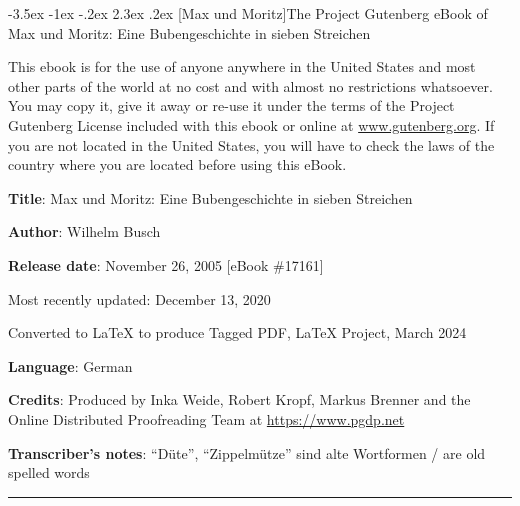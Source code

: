 \documentclass[a4paper,12pt]{article}
\makeatletter
\renewcommand\section{\@startsection {section}{1}{\z@}%
                                   {-3.5ex \@plus -1ex \@minus -.2ex}%
                                   {2.3ex \@plus.2ex}%
                                   {\centering\normalfont\LARGE\bfseries}}
\makeatother
\begin{document}
  
  
\begin{otherlanguage}{english}

  \section[Max und Moritz]{The Project Gutenberg eBook of {Max und
      Moritz: Eine Bubengeschichte in sieben
      Streichen}\label{pg-header-heading}}

    


This ebook is for the use of anyone anywhere in the United States and
most other parts of the world at no cost and with almost no restrictions
whatsoever. You may copy it, give it away or re-use it under the terms
of the Project Gutenberg License included with this ebook or online
at \href{https://www.gutenberg.org}{www.gutenberg.org}. If you are not located in the United States,
you will have to check the laws of the country where you are located
before using this eBook.

    
\end{otherlanguage}


\bigskip

\textbf{Title}: Max und Moritz: Eine Bubengeschichte in sieben Streichen

\textbf{Author}: Wilhelm Busch


\smallskip

\begin{otherlanguage}{english}
\textbf{Release date}: November 26, 2005 [eBook \#17161]

                Most recently updated: December 13, 2020

        Converted to \textsf{\LaTeX} to produce Tagged PDF, \textsf{\LaTeX} Project, March 2024

\smallskip
                
\textbf{Language}: German

\smallskip
                
\textbf{Credits}: Produced by Inka Weide, Robert Kropf, Markus Brenner and
        the Online Distributed Proofreading Team at
        \url{https://www.pgdp.net}


\smallskip

\textbf{Transcriber's notes}: 
``Düte'', ``Zippelmütze'' sind alte Wortformen / are old spelled words
\end{otherlanguage}


\bigskip
\hrule

\clearpage
\end{document}
